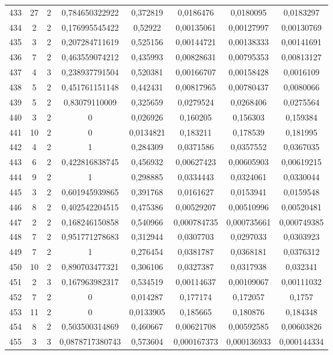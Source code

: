 \begin{longtable}{|c|c|c|c|c|c|c|c|}
433 & 27 & 2 & 0,784650322922 & 0,372819 & 0,0186476 & 0,0180095 & 0,0183297  \\
434 & 2 & 2 & 0,176995545422 & 0,52922 & 0,00135061 & 0,00127997 & 0,00130769  \\
435 & 3 & 2 & 0,207284711619 & 0,525156 & 0,00144721 & 0,00138333 & 0,00141691  \\
436 & 7 & 2 & 0,463559074212 & 0,435993 & 0,00828631 & 0,00795353 & 0,00813127  \\
437 & 4 & 3 & 0,238937791504 & 0,520381 & 0,00166707 & 0,00158428 & 0,0016109  \\
438 & 5 & 2 & 0,451761151148 & 0,442431 & 0,00817965 & 0,00780437 & 0,0080066  \\
439 & 5 & 2 & 0,83079110009 & 0,325659 & 0,0279524 & 0,0268406 & 0,0275564  \\
440 & 3 & 2 & 0 & 0,026926 & 0,160205 & 0,156303 & 0,159384  \\
441 & 10 & 2 & 0 & 0,0134821 & 0,183211 & 0,178539 & 0,181995  \\
442 & 4 & 2 & 1 & 0,284309 & 0,0371586 & 0,0357552 & 0,0367035  \\
443 & 6 & 2 & 0,422816838745 & 0,456932 & 0,00627423 & 0,00605903 & 0,00619215  \\
444 & 9 & 2 & 1 & 0,298885 & 0,0334443 & 0,0324061 & 0,0330044  \\
445 & 3 & 2 & 0,601945939865 & 0,391768 & 0,0161627 & 0,0153941 & 0,0159548  \\
446 & 8 & 2 & 0,402542204515 & 0,475386 & 0,00529207 & 0,00510996 & 0,00520481  \\
447 & 2 & 2 & 0,168246150858 & 0,540966 & 0,000784735 & 0,000735661 & 0,000749385  \\
448 & 7 & 2 & 0,951771278683 & 0,312944 & 0,0307703 & 0,0297033 & 0,0303923  \\
449 & 7 & 2 & 1 & 0,276454 & 0,0381787 & 0,0368181 & 0,0376312  \\
450 & 10 & 2 & 0,890703477321 & 0,306106 & 0,0327387 & 0,0317938 & 0,032341  \\
451 & 2 & 3 & 0,167963982317 & 0,534519 & 0,00114637 & 0,00109067 & 0,00111032  \\
452 & 7 & 2 & 0 & 0,014287 & 0,177174 & 0,172057 & 0,1757  \\
453 & 11 & 2 & 0 & 0,0133905 & 0,185665 & 0,180876 & 0,184348  \\
454 & 8 & 2 & 0,503500314869 & 0,460667 & 0,00621708 & 0,00592585 & 0,00603826  \\
455 & 3 & 3 & 0,0878717380743 & 0,573604 & 0,000167373 & 0,000136933 & 0,000144334  \\

\end{longtable}
